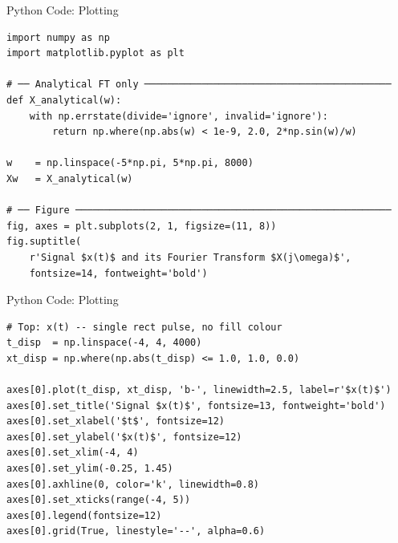 \documentclass{beamer}
\begin{document}
\begin{frame}[fragile]{Python Code: Plotting}


\begin{lstlisting}
import numpy as np
import matplotlib.pyplot as plt

# ── Analytical FT only ───────────────────────────────────────────
def X_analytical(w):
    with np.errstate(divide='ignore', invalid='ignore'):
        return np.where(np.abs(w) < 1e-9, 2.0, 2*np.sin(w)/w)

w    = np.linspace(-5*np.pi, 5*np.pi, 8000)
Xw   = X_analytical(w)

# ── Figure ───────────────────────────────────────────────────────
fig, axes = plt.subplots(2, 1, figsize=(11, 8))
fig.suptitle(
    r'Signal $x(t)$ and its Fourier Transform $X(j\omega)$',
    fontsize=14, fontweight='bold')
\end{lstlisting}
\end{frame}

\begin{frame}[fragile]{Python Code: Plotting}


\begin{lstlisting}
# Top: x(t) -- single rect pulse, no fill colour
t_disp  = np.linspace(-4, 4, 4000)
xt_disp = np.where(np.abs(t_disp) <= 1.0, 1.0, 0.0)

axes[0].plot(t_disp, xt_disp, 'b-', linewidth=2.5, label=r'$x(t)$')
axes[0].set_title('Signal $x(t)$', fontsize=13, fontweight='bold')
axes[0].set_xlabel('$t$', fontsize=12)
axes[0].set_ylabel('$x(t)$', fontsize=12)
axes[0].set_xlim(-4, 4)
axes[0].set_ylim(-0.25, 1.45)
axes[0].axhline(0, color='k', linewidth=0.8)
axes[0].set_xticks(range(-4, 5))
axes[0].legend(fontsize=12)
axes[0].grid(True, linestyle='--', alpha=0.6)
\end{lstlisting}
\end{frame}
\end{document}
